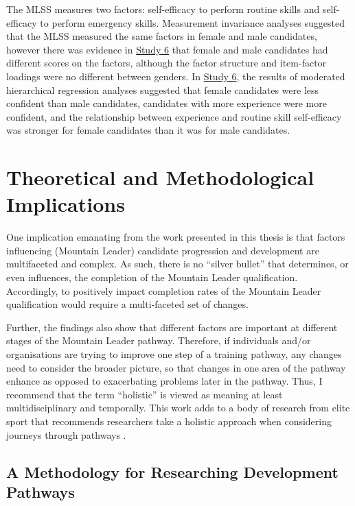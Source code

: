 \documentclass[
  12pt,
  a4paper,
]{book}
\begin{document}
The MLSS measures two factors: self-efficacy to perform routine skills and self-efficacy to perform emergency skills. Measurement invariance analyses suggested that the MLSS measured the same factors in female and male candidates, however there was evidence in \href{study-6}{Study 6} that female and male candidates had different scores on the factors, although the factor structure and item-factor loadings were no different between genders. In \href{study-6}{Study 6}, the results of moderated hierarchical regression analyses suggested that female candidates were less confident than male candidates, candidates with more experience were more confident, and the relationship between experience and routine skill self-efficacy was stronger for female candidates than it was for male candidates.

\hypertarget{theoretical-and-methodological-implications}{%
\section{Theoretical and Methodological Implications}\label{theoretical-and-methodological-implications}}

One implication emanating from the work presented in this thesis is that factors influencing (Mountain Leader) candidate progression and development are multifaceted and complex. As such, there is no ``silver bullet'' that determines, or even influences, the completion of the Mountain Leader qualification. Accordingly, to positively impact completion rates of the Mountain Leader qualification would require a multi-faceted set of changes.

Further, the findings also show that different factors are important at different stages of the Mountain Leader pathway. Therefore, if individuals and/or organisations are trying to improve one step of a training pathway, any changes need to consider the broader picture, so that changes in one area of the pathway enhance as opposed to exacerbating problems later in the pathway. Thus, I recommend that the term ``holistic'' is viewed as meaning at least multidisciplinary and temporally. This work adds to a body of research from elite sport that recommends researchers take a holistic approach when considering journeys through pathways \citep[e.g.,][]{Jones2019a, Gullich2019, Hardy2017}.

\hypertarget{a-methodology-for-researching-development-pathways}{%
\subsection{A Methodology for Researching Development Pathways}\label{a-methodology-for-researching-development-pathways}}
\end{document}
